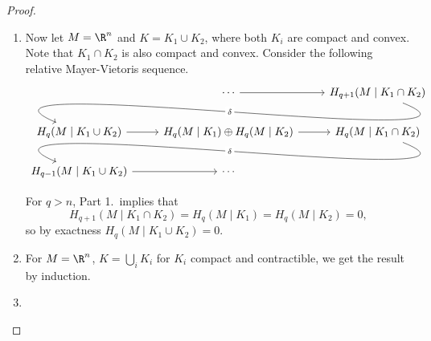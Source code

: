 \documentclass[main.tex]{subfiles}
\begin{document}
\begin{proof}
\begin{enumerate}
    \item Now let \(M = \R^{n}\) and \(K = K_{1} \cup K_{2}\), where both \(K_{i}\) are compact and convex. Note that \(K_{1} \cap K_{2}\) is also compact and convex. Consider the following relative Mayer-Vietoris sequence.
      \begin{equation*}
        \begin{tikzcd}
          & \cdots
          \arrow[r]
          & H_{q+1}(M\mid K_{1} \cap K_{2})
          \\
          H_{q}(M\mid K_{1} \cup K_{2})
          \arrow[from=urr, out=-22, in=157, looseness=1, overlay, "\delta" description]
          \arrow[r]
          & H_{q}(M\mid K_{1}) \oplus H_{q}(M\mid K_{2})
          \arrow[r]
          & H_{q}(M\mid K_{1} \cap K_{2})
          \\
          H_{q-1}(M\mid K_{1} \cup K_{2})
          \arrow[r]
          \arrow[from=urr, out=-22, in=157, looseness=1, overlay, "\delta" description]
          & \cdots
        \end{tikzcd}
      \end{equation*}

      For \(q > n\), Part 1.\ implies that
      \begin{equation*}
        H_{q+1}(M\mid K_{1} \cap K_{2}) = H_{q}(M \mid K_{1}) = H_{q}(M \mid K_{2}) = 0,
      \end{equation*}
      so by exactness \(H_{q}(M \mid K_{1} \cup K_{2}) = 0\).

    \item For \(M = \R^{n}\), \(K = \bigcup_{i} K_{i}\) for \(K_{i}\) compact and contractible, we get the result by induction.

    \item
  \end{enumerate}
\end{proof}
\end{document}
